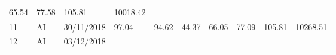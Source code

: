 \documentclass[
  11pt,
]{article}
\begin{document}
\begin{longtable}[]{@{}llllllllll@{}}
\begin{minipage}[t]{0.07\columnwidth}
65.54\strut
\end{minipage} & \begin{minipage}[t]{0.07\columnwidth}\raggedright
77.58\strut
\end{minipage} & \begin{minipage}[t]{0.08\columnwidth}\raggedright
105.81\strut
\end{minipage} & \begin{minipage}[t]{0.09\columnwidth}\raggedright
10018.42\strut
\end{minipage}\tabularnewline
\begin{minipage}[t]{0.05\columnwidth}\raggedright
11\strut
\end{minipage} & \begin{minipage}[t]{0.07\columnwidth}\raggedright
AI\strut
\end{minipage} & \begin{minipage}[t]{0.11\columnwidth}\raggedright
30/11/2018\strut
\end{minipage} & \begin{minipage}[t]{0.07\columnwidth}\raggedright
97.04\strut
\end{minipage} & \begin{minipage}[t]{0.07\columnwidth}\raggedright
94.62\strut
\end{minipage} & \begin{minipage}[t]{0.07\columnwidth}\raggedright
44.37\strut
\end{minipage} & \begin{minipage}[t]{0.07\columnwidth}\raggedright
66.05\strut
\end{minipage} & \begin{minipage}[t]{0.07\columnwidth}\raggedright
77.09\strut
\end{minipage} & \begin{minipage}[t]{0.08\columnwidth}\raggedright
105.81\strut
\end{minipage} & \begin{minipage}[t]{0.09\columnwidth}\raggedright
10268.51\strut
\end{minipage}\tabularnewline
\begin{minipage}[t]{0.05\columnwidth}\raggedright
12\strut
\end{minipage} & \begin{minipage}[t]{0.07\columnwidth}\raggedright
AI\strut
\end{minipage} & \begin{minipage}[t]{0.11\columnwidth}\raggedright
03/12/2018\strut
\end{minipage} & \begin{minipage}[t]{0.07\columnwidth}\raggedright

\end{minipage}
\end{longtable}
\end{document}
